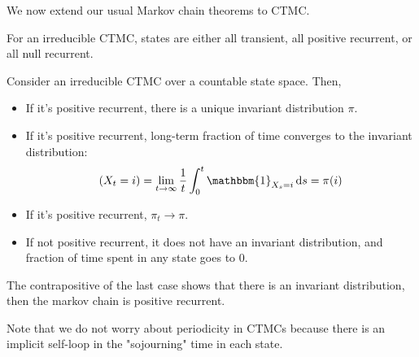 We now extend our usual Markov chain theorems to CTMC.

\begin{theorem}
    For an irreducible CTMC, states are either all transient, all positive recurrent, or all null recurrent.
\end{theorem}

\begin{theorem}
    Consider an irreducible CTMC over a countable state space. Then,
    \begin{itemize}
        \item If it's positive recurrent, there is a unique invariant distribution $\pi$.
        \item If it's positive recurrent, long-term fraction of time converges to the invariant distribution:
        \[ (X_t = i) = \lim_{t \to \infty} \frac{1}{t} \int_0^{t} \mathbbm{1}_{X_s = i} \dd{s} = \pi(i) \]
        \item If it's positive recurrent, $\pi_t \to \pi$.
        \item If not positive recurrent, it does not have an invariant distribution, and fraction of time spent in any state goes to 0.
    \end{itemize}
    The contrapositive of the last case shows that there is an invariant distribution, then the markov chain is positive recurrent.
\end{theorem}

Note that we do not worry about periodicity in CTMCs because there is an implicit self-loop in the "sojourning" time
in each state.

